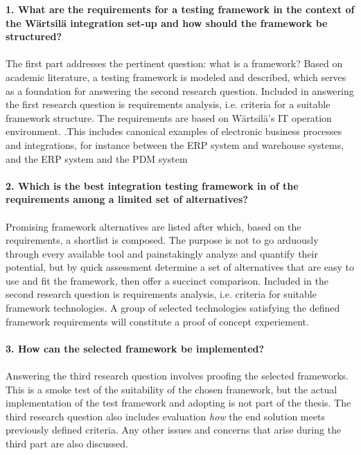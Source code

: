 \documentclass[12pt,a4paper,oneside,pdftex]{report}
\begin{document}
\begin{adjustwidth}{2.5em}{0pt}
\textbf{1. What are the requirements for a testing framework in the context of the W{\"a}rtsil{\"a} integration set-up and how should the framework be structured?} \\
\\
The first part addresses the pertinent question: what is a framework? Based on academic literature, a testing framework is modeled and described, which serves as a foundation for answering the second research question. Included in answering the first research question is requirements analysis, i.e. criteria for a suitable framework structure. The requirements are based on W{\"a}rtsil{\"a}'s IT operation environment. .This includes canonical examples of electronic business processes and integrations, for instance between the ERP system and warehouse systems, and the ERP system and the PDM system \\
\\
\textbf{2. Which is the best integration testing framework in of the requirements among a limited set of alternatives?} \\
\\
Promising framework alternatives are listed after which, based on the requirements, a shortlist is composed. The purpose is not to go arduously through every available tool and painstakingly analyze and quantify their potential, but by quick assessment determine a set of alternatives that are easy to use and fit the framework, then offer a succinct comparison. Included in the second research question is requirements analysis, i.e. criteria for suitable framework technologies. A group of selected technologies satisfying the defined framework requirements will constitute a proof of concept experiement. \\
\\
\textbf{3. How can the selected framework be implemented?} \\
\\
Answering the third research question involves proofing the selected frameworks. This is a smoke test of the suitability of the chosen framework, but the actual implementation of the test framework and adopting is not part of the thesis. The third research question also includes evaluation \emph{how} the end solution meets previously defined criteria. Any other issues and concerns that arise during the third part are also discussed. \\
\end{adjustwidth}
\end{document}
